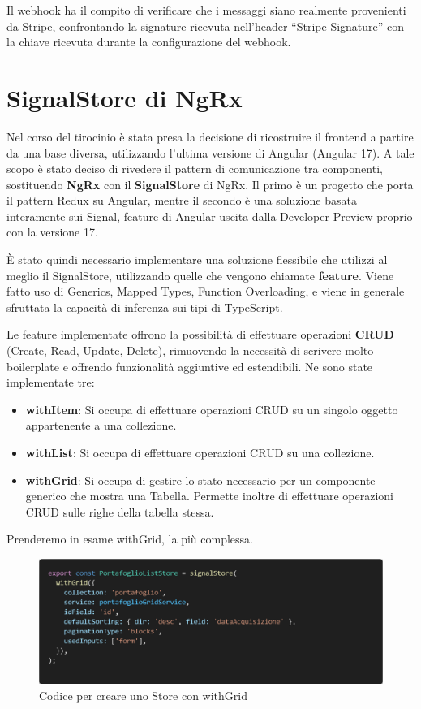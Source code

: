 Il webhook ha il compito di verificare che i messaggi siano realmente provenienti da Stripe, confrontando la signature ricevuta nell'header ``Stripe-Signature'' con la
chiave ricevuta durante la configurazione del webhook.

\section{SignalStore di NgRx}
Nel corso del tirocinio \`e stata presa la decisione di ricostruire il frontend a partire da una base diversa, utilizzando l'ultima versione di Angular (Angular 17).
A tale scopo \`e stato deciso di rivedere il pattern di comunicazione tra componenti, sostituendo \textbf{NgRx} con il \textbf{SignalStore} di NgRx.
Il primo \`e un progetto che porta il pattern Redux su Angular, mentre il secondo \`e una soluzione basata interamente sui Signal, feature di Angular uscita dalla
Developer Preview proprio con la versione 17.

\`E stato quindi necessario implementare una soluzione flessibile che utilizzi al meglio il SignalStore, utilizzando quelle che vengono chiamate \textbf{feature}.
Viene fatto uso di Generics, Mapped Types, Function Overloading, e viene in generale sfruttata la capacit\`a di inferenza sui tipi di TypeScript.

Le feature implementate offrono la possibilit\`a di effettuare operazioni \textbf{CRUD} (Create, Read, Update, Delete), rimuovendo la necessit\`a di scrivere molto boilerplate e offrendo
funzionalit\`a aggiuntive ed estendibili.
Ne sono state implementate tre:
\begin{itemize}
  \item \textbf{withItem}: Si occupa di effettuare operazioni CRUD su un singolo oggetto appartenente a una collezione.
  \item \textbf{withList}: Si occupa di effettuare operazioni CRUD su una collezione.
  \item \textbf{withGrid}: Si occupa di gestire lo stato necessario per un componente generico che mostra una Tabella. Permette inoltre di effettuare operazioni CRUD sulle righe
    della tabella stessa.
\end{itemize}

Prenderemo in esame withGrid, la pi\`u complessa.
\\
\begin{figure}[H]
  \centering
  \includegraphics[width=12cm]{images/code-store.png}
  \caption{Codice per creare uno Store con withGrid}
\end{figure}

